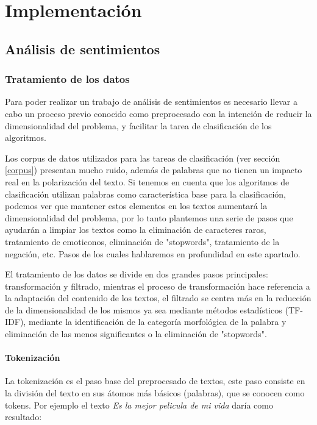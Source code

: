 \chapter{Implementación}

\section{Análisis de sentimientos}

\subsection{Tratamiento de los datos}

Para poder realizar un trabajo de análisis de sentimientos es necesario llevar a cabo un proceso previo conocido como preprocesado con la intención de reducir la dimensionalidad del problema, y facilitar la tarea de clasificación de los algoritmos.

Los corpus de datos utilizados para las tareas de clasificación (ver sección \ref{corpus}) presentan mucho ruido,  además de palabras que no tienen un impacto real en la polarización del texto. Si tenemos en cuenta que los algoritmos de clasificación utilizan palabras como característica base para la clasificación, podemos ver que mantener estos elementos en los textos aumentará la dimensionalidad del problema, por lo tanto plantemos una serie de pasos que ayudarán a limpiar los textos como la eliminación de caracteres raros, tratamiento de emoticonos, eliminación de "stopwords", tratamiento de la negación, etc. Pasos de los cuales hablaremos en profundidad en este apartado.

El tratamiento de los datos se divide en dos grandes pasos principales: transformación y filtrado, mientras el proceso de transformación hace referencia a la adaptación del contenido de los textos, el filtrado se centra más en la reducción de la dimensionalidad de los mismos ya sea mediante métodos estadísticos (TF-IDF), mediante la identificación de la categoría morfológica de la palabra y eliminación de las menos significantes o la eliminación de "stopwords".

\subsubsection{Tokenización}

La tokenización es el paso base del preprocesado de textos, este paso consiste en la división del texto en sus átomos más básicos (palabras), que se conocen como tokens. Por ejemplo el texto \textit{ Es la mejor pelicula de mi vida } daría como resultado:


